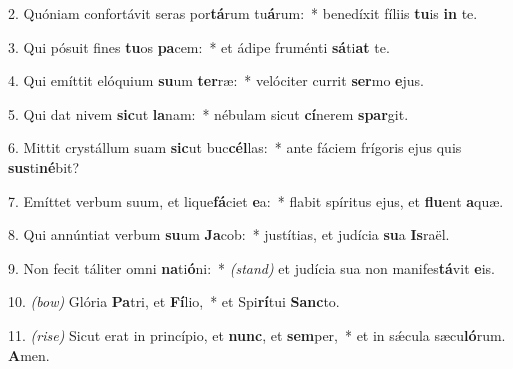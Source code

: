 2. Quóniam confortávit seras por\textbf{tá}rum tu\textbf{á}rum:~* benedíxit fíliis \textbf{tu}is \textbf{in} te.

3. Qui pósuit fines \textbf{tu}os \textbf{pa}cem:~* et ádipe fruménti \textbf{sá}ti\textbf{at} te.

4. Qui emíttit elóquium \textbf{su}um \textbf{ter}ræ:~* velóciter currit \textbf{ser}mo \textbf{e}jus.

5. Qui dat nivem \textbf{sic}ut \textbf{la}nam:~* nébulam sicut \textbf{cí}nerem \textbf{spar}git.

6. Mittit crystállum suam \textbf{sic}ut buc\textbf{cél}las:~* ante fáciem frígoris ejus quis \textbf{sus}ti\textbf{né}bit?

7. Emíttet verbum suum, et lique\textbf{fá}ciet \textbf{e}a:~* flabit spíritus ejus, et \textbf{flu}ent \textbf{a}quæ.

8. Qui annúntiat verbum \textbf{su}um \textbf{Ja}cob:~* justítias, et judícia \textbf{su}a \textbf{Is}raël.

9. Non fecit táliter omni \textbf{na}ti\textbf{ó}ni:~* {\color{red}\textit{(stand)}} et judícia sua non manifes\textbf{tá}vit \textbf{e}is.

10. {\color{red}\textit{(bow)}} Glória \textbf{Pa}tri, et \textbf{Fí}lio,~* et Spi\textbf{rí}tui \textbf{Sanc}to.

11. {\color{red}\textit{(rise)}} Sicut erat in princípio, et \textbf{nunc}, et \textbf{sem}per,~* et in sǽcula sæcu\textbf{ló}rum. \textbf{A}men.
